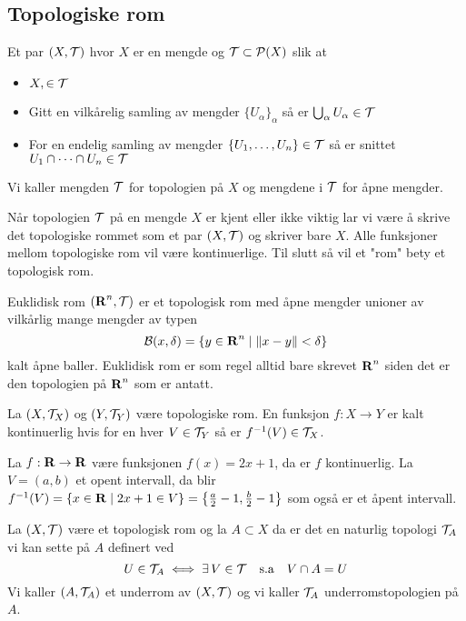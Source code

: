 \subsection{Topologiske rom}\label{Sec:Top}
\begin{definisjon}\label{Def:TopRom}
    Et par $(X,\mathcal{T})$ hvor $X$ er en mengde og $\mathcal{T}\subset\mathcal{P}(X)$ slik at 
    \begin{itemize}
        \item $X,\es\in\Tcal$
        \item Gitt en vilkårelig samling av mengder $\{U_\alpha\}_{\alpha}$ så er $\bigcup_\alpha U_\alpha\in\mathcal{T}$
        \item For en endelig samling av mengder $\{U_1,\dots,U_n\}\in\mathcal{T}$ så er snittet $U_1\cap\dots\cap U_n\in\mathcal{T}$
    \end{itemize}
    Vi kaller mengden $\mathcal{T}$ for topologien på $X$ og mengdene i $\mathcal{T}$ for åpne mengder.
\end{definisjon}

Når topologien $\mathcal{T}$ på en mengde $X$ er kjent eller ikke viktig lar vi være å skrive det topologiske rommet som et par $(X,\mathcal{T})$ og skriver bare $X$. Alle funksjoner mellom topologiske rom vil være kontinuerlige. Til slutt så vil et "rom" bety et topologisk rom.

\begin{eksempel}\label{Ex:EukTRom}
    Euklidisk rom $(\textnormal{\textbf{{R}}}^n,\mathcal{T})$ er et topologisk rom med åpne mengder unioner av vilkårlig mange mengder av typen
    \[\mathcal{B}(x,\delta) = \{y\in\textnormal{\textbf{{R}}}^n\;|\; \|x-y\|<\delta\}\]
    kalt åpne baller. Euklidisk rom er som regel alltid bare skrevet $\textnormal{\textbf{{R}}}^n$ siden det er den topologien på
$\textnormal{\textbf{{R}}}^n$ som er antatt.
\end{eksempel}

\begin{definisjon}\label{Def:KontFunk}
    La $(X,\mathcal{T}_X)$ og $(Y,\mathcal{T}_Y)$ være topologiske rom. En funksjon $f: X\to Y$ er kalt kontinuerlig hvis for en hver \(V\in\mathcal{T}_Y\) så er \(f^{-1}(V)\in\mathcal{T}_X\).
\end{definisjon}

\begin{eksempel}\label{Ex:KontFunk}
    La $f: \textnormal{\textbf{{R}}}\to \textnormal{\textbf{{R}}}$ være funksjonen $f(x)=2x+1$, da er $f$ kontinuerlig. La $V = (a,b)$ et opent intervall,
da blir $f^{-1}(V) = \{x\in\textnormal{\textbf{{R}}}\;|\;2x+1\in V\}=\left\{\frac{a}{2}-1,\frac{b}{2}-1\right\}$ som også er et åpent intervall.
\end{eksempel}

\begin{definisjon}\label{Def:UnderTop}
    La $(X,\mathcal{T})$ være et topologisk rom og la $A\subset X$ da er det en naturlig topologi $\mathcal{T}_A$ vi kan sette på $A$ definert ved
    \[U\in\mathcal{T}_A \iff \exists\, V\in\mathcal{T}\quad\text{s.a}\quad V\cap A = U\]
    Vi kaller $(A,\mathcal{T}_A)$ et underrom av $(X,\mathcal{T})$ og vi kaller $\mathcal{T}_A$ underromstopologien på $A$.
\end{definisjon}


